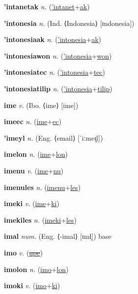 \textbf{\hypertarget{'intanetak}{'intanetak}} \textit{n.} (\hyperlink{'intanet}{'intanet}+\allowbreak \hyperlink{ak}{ak})


\textbf{\hypertarget{'intonesia}{'intonesia}} \textit{n.} (Ind. ⟨Indonesia⟩ [ɪndonesia])


\textbf{\hypertarget{'intonesiaak}{'intonesiaak}} \textit{n.} (\hyperlink{'intonesia}{'intonesia}+\allowbreak \hyperlink{ak}{ak})


\textbf{\hypertarget{'intonesiawon}{'intonesiawon}} \textit{n.} (\hyperlink{'intonesia}{'intonesia}+\allowbreak \hyperlink{won}{won})


\textbf{\hypertarget{'intonesiatec}{'intonesiatec}} \textit{n.} (\hyperlink{'intonesia}{'intonesia}+\allowbreak \hyperlink{tec}{tec})


\textbf{\hypertarget{'intonesiatilip}{'intonesiatilip}} \textit{n.} (\hyperlink{'intonesia}{'intonesia}+\allowbreak \hyperlink{tilip}{tilip})


\textbf{\hypertarget{ime}{ime}} \textit{v.} (Ibo. ⟨ime⟩ [ime])


\textbf{\hypertarget{imeec}{imeec}} \textit{n.} (\hyperlink{ime}{ime}+\allowbreak \hyperlink{ec}{ec})


\textbf{\hypertarget{'imeyl}{'imeyl}} \textit{n.} (Eng. ⟨email⟩ [ˈiːmeɪ̯l])


\textbf{\hypertarget{imelon}{imelon}} \textit{n.} (\hyperlink{ime}{ime}+\allowbreak \hyperlink{lon}{lon})


\textbf{\hypertarget{imenu}{imenu}} \textit{v.} (\hyperlink{ime}{ime}+\allowbreak \hyperlink{nu}{nu})


\textbf{\hypertarget{imenules}{imenules}} \textit{n.} (\hyperlink{imenu}{imenu}+\allowbreak \hyperlink{les}{les})


\textbf{\hypertarget{imeki}{imeki}} \textit{v.} (\hyperlink{ime}{ime}+\allowbreak \hyperlink{ki}{ki})


\textbf{\hypertarget{imekiles}{imekiles}} \textit{n.} (\hyperlink{imeki}{imeki}+\allowbreak \hyperlink{les}{les})


\textbf{\hypertarget{imal}{imal}} \textit{num.} (Eng. ⟨-imal⟩ [ɪml̩])
base

\textbf{\hypertarget{imo}{imo}} \textit{v.} (\hyperlink{upe}{\sout{upe}})


\textbf{\hypertarget{imolon}{imolon}} \textit{n.} (\hyperlink{imo}{imo}+\allowbreak \hyperlink{lon}{lon})


\textbf{\hypertarget{imoki}{imoki}} \textit{v.} (\hyperlink{imo}{imo}+\allowbreak \hyperlink{ki}{ki})


